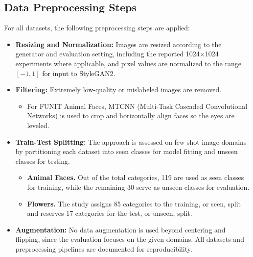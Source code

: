 \subsection{Data Preprocessing Steps}

For all datasets, the following preprocessing steps are applied:

\begin{itemize}
    \item \textbf{Resizing and Normalization:} Images are resized according to the generator and evaluation setting, including the reported 1024$\times$1024 experiments where applicable, and pixel values are normalized to the range $[-1, 1]$ for input to StyleGAN2.
    \item \textbf{Filtering:} Extremely low-quality or mislabeled images are removed.
    \begin{itemize}
        \item For FUNIT Animal Faces, MTCNN (Multi-Task Cascaded Convolutional Networks) is used to crop and horizontally align faces so the eyes are leveled.
    \end{itemize}
    \item \textbf{Train-Test Splitting:} The approach is assessed on few-shot image domains by partitioning each dataset into seen classes for model fitting and unseen classes for testing.
    \begin{itemize}
        \item \textbf{Animal Faces.} Out of the total categories, 119 are used as seen classes for training, while the remaining 30 serve as unseen classes for evaluation.
        \item \textbf{Flowers.} The study assigns 85 categories to the training, or seen, split and reserves 17 categories for the test, or unseen, split.
    \end{itemize}
    \item \textbf{Augmentation:} No data augmentation is used beyond centering and flipping, since the evaluation focuses on the given domains. All datasets and preprocessing pipelines are documented for reproducibility.
\end{itemize}
